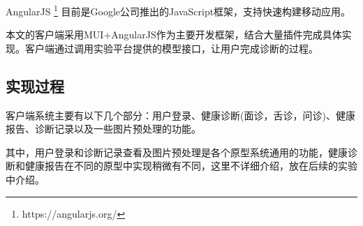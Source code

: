 AngularJS \footnote{https://angularjs.org/} 目前是Google公司推出的JavaScript框架，支持快速构建移动应用。

本文的客户端采用MUI+AngularJS作为主要开发框架，结合大量插件完成具体实现。客户端通过调用实验平台提供的模型接口，让用户完成诊断的过程。

\subsection{实现过程}

客户端系统主要有以下几个部分：用户登录、健康诊断(面诊，舌诊，问诊)、健康报告、诊断记录以及一些图片预处理的功能。

其中，用户登录和诊断记录查看及图片预处理是各个原型系统通用的功能，健康诊断和健康报告在不同的原型中实现稍微有不同，这里不详细介绍，放在后续的实验中介绍。


